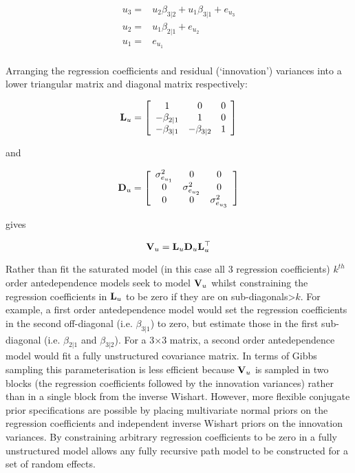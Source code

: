 \documentclass{article}
\begin{document}
\begin{equation}
\begin{array}{rl}
u_{3} =&  u_{2}\beta_{3|2}+u_{1}\beta_{3|1}+e_{u_{3}}\\ 
u_{2} =&  u_{1}\beta_{2|1}+e_{u_{2}}\\ 
u_{1} =&  e_{u_{1}}\\ 
\end{array}
\end{equation}

Arranging the regression coefficients and residual (`innovation') variances into a lower triangular matrix and diagonal matrix respectively:

\begin{equation}
{\bf L}_{u}=
\left[
\begin{array}{ccc}
1&0&0\\
-\beta_{2|1}&1&0\\
-\beta_{3|1}&-\beta_{3|2}&1\\
\end{array}
\right]
\end{equation} 

and 

\begin{equation}
{\bf D}_{u}=
\left[
\begin{array}{ccc}
\sigma^{2}_{e_{u_{1}}}&0&0\\
0&\sigma^{2}_{e_{u_{2}}}&0\\
0&0&\sigma^{2}_{e_{u_{3}}}\\
\end{array}
\right]
\end{equation} 


gives

\begin{equation}
{\bf V}_{u} =  {\bf L}_{u}{\bf D}_{u}{\bf L}_{u}^{\top}
\end{equation}

Rather than fit the saturated model (in this case all 3 regression coefficients) $k^{th}$ order antedependence models seek to model ${\bf V}_{u}$ whilst constraining the regression coefficients in ${\bf L}_{u}$ to be zero if they are on sub-diagonals>$k$. For example, a first order antedependence model would set the regression coefficients in the second off-diagonal (i.e. $\beta_{3|1}$) to zero, but estimate those in the first sub-diagonal (i.e. $\beta_{2|1}$ and $\beta_{3|2}$). For a 3$\times$3 matrix, a second order antedependence model would fit a fully unstructured covariance matrix. In terms of Gibbs sampling this parameterisation is less efficient because ${\bf V}_{u}$ is sampled in two blocks (the regression coefficients followed by the innovation variances) rather than in a single block from the inverse Wishart. However, more flexible conjugate prior specifications are possible by placing multivariate normal priors on the regression coefficients and independent inverse Wishart priors on the innovation variances. By constraining arbitrary regression coefficients to be zero in a fully unstructured model allows any fully recursive path model to be constructed for a set of random effects.
\end{document}
